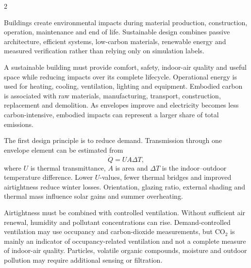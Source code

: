 

\begin{multicols}{2}
\begin{engineeringnews}
Buildings create environmental impacts during material production, construction, operation, maintenance and end
of life. Sustainable design combines passive architecture, efficient systems, low-carbon materials, renewable
energy and measured verification rather than relying only on simulation labels.
\end{engineeringnews}

\begin{ecarticle}
A sustainable building must provide comfort, safety, indoor-air quality and useful space while reducing impacts
over its complete lifecycle. Operational energy is used for heating, cooling, ventilation, lighting and equipment.
Embodied carbon is associated with raw materials, manufacturing, transport, construction, replacement and demolition.
As envelopes improve and electricity becomes less carbon-intensive, embodied impacts can represent a larger share
of total emissions.

The first design principle is to reduce demand. Transmission through one envelope element can be estimated from
\[
\dot Q=UA\Delta T,
\]
where $U$ is thermal transmittance, $A$ is area and $\Delta T$ is the indoor--outdoor temperature difference.
Lower $U$-values, fewer thermal bridges and improved airtightness reduce winter losses. Orientation, glazing ratio,
external shading and thermal mass influence solar gains and summer overheating.

Airtightness must be combined with controlled ventilation. Without sufficient air renewal, humidity and pollutant
concentrations can rise. Demand-controlled ventilation may use occupancy and carbon-dioxide measurements, but
CO$_2$ is mainly an indicator of occupancy-related ventilation and not a complete measure of indoor-air quality.
Particles, volatile organic compounds, moisture and outdoor pollution may require additional sensing or filtration.


\end{ecarticle}
\end{multicols}
